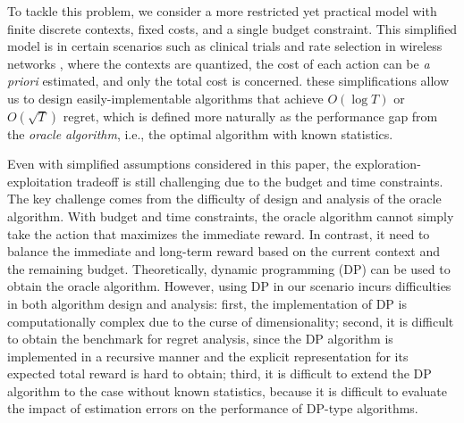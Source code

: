 {To tackle this problem, we consider a more restricted yet practical model with finite discrete contexts, fixed costs, and a single budget constraint.
This simplified model is   in certain scenarios such as clinical trials \cite{Lai2012SA} and rate selection in wireless networks \cite{Combes2014Infocom}, where the contexts are quantized, the cost of each action can be {\it a priori} estimated, and only the total cost is concerned.
 these simplifications allow us to design easily-implementable algorithms that achieve $O(\log T)$ or $O(\sqrt{T})$ regret, which is defined more naturally as the performance gap from the \emph{oracle algorithm}, i.e., the optimal algorithm with known statistics.

Even with simplified assumptions considered in this paper, the exploration-exploitation tradeoff is still challenging
due to the budget and time constraints. The key  challenge comes from the difficulty of design and analysis of the oracle algorithm.
With budget and time constraints, the oracle algorithm cannot simply take the action that maximizes the immediate reward. In contrast, it need to balance the immediate and long-term reward based on the current context and the remaining budget.
Theoretically, dynamic programming (DP) can be used to obtain the oracle algorithm. However, using DP in our scenario incurs difficulties in both algorithm design and analysis: first, the implementation of DP is computationally complex due to the curse of dimensionality; second, it is difficult to obtain the benchmark for regret analysis, since the DP algorithm is implemented in a recursive manner and the explicit representation for its expected total reward is hard to obtain; third, it is difficult to extend the DP algorithm to the case without known statistics, because it is difficult to evaluate the impact of estimation errors on the performance of DP-type algorithms. 

}
